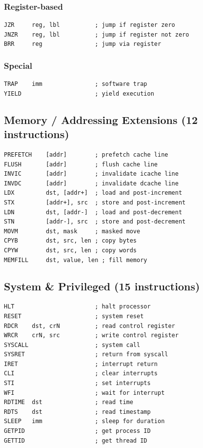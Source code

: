 \documentclass[12pt]{article}
\begin{document}
\subsubsection{Register-based}

\begin{lstlisting}
JZR     reg, lbl          ; jump if register zero
JNZR    reg, lbl          ; jump if register not zero
BRR     reg               ; jump via register
\end{lstlisting}

\subsubsection{Special}

\begin{lstlisting}
TRAP    imm               ; software trap
YIELD                     ; yield execution
\end{lstlisting}

\subsection{Memory / Addressing Extensions (12 instructions)}

\begin{lstlisting}
PREFETCH    [addr]        ; prefetch cache line
FLUSH       [addr]        ; flush cache line
INVIC       [addr]        ; invalidate icache line
INVDC       [addr]        ; invalidate dcache line
LDX         dst, [addr+]  ; load and post-increment
STX         [addr+], src  ; store and post-increment
LDN         dst, [addr-]  ; load and post-decrement
STN         [addr-], src  ; store and post-decrement
MOVM        dst, mask     ; masked move
CPYB        dst, src, len ; copy bytes
CPYW        dst, src, len ; copy words
MEMFILL     dst, value, len ; fill memory
\end{lstlisting}

\subsection{System \& Privileged (15 instructions)}

\begin{lstlisting}
HLT                       ; halt processor
RESET                     ; system reset
RDCR    dst, crN          ; read control register
WRCR    crN, src          ; write control register
SYSCALL                   ; system call
SYSRET                    ; return from syscall
IRET                      ; interrupt return
CLI                       ; clear interrupts
STI                       ; set interrupts
WFI                       ; wait for interrupt
RDTIME  dst               ; read time
RDTS    dst               ; read timestamp
SLEEP   imm               ; sleep for duration
GETPID                    ; get process ID
GETTID                    ; get thread ID
\end{lstlisting}
\end{document}
